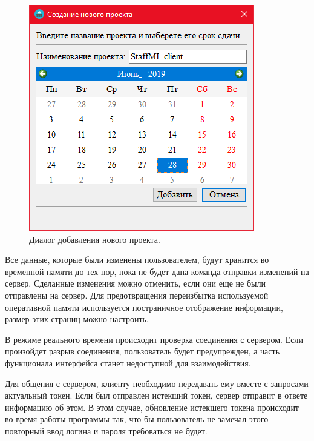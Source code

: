 \begin{figure}[h]
    \centering
    \includegraphics[width=0.5\linewidth]{img/add_project.png}
    \caption{Диалог добавления нового проекта.}
    \label{fig:add_project_window_win}
\end{figure}

Все данные, которые были изменены пользователем, будут хранится во временной памяти до тех пор, пока не будет дана команда отправки изменений на сервер.
Сделанные изменения можно отменить, если они еще не были отправлены на сервер.
Для предотвращения переизбытка используемой оперативной памяти используется постраничное отображение информации, размер этих страниц можно настроить.

В режиме реального времени происходит проверка соединения с сервером. Если произойдет разрыв соединения, пользователь будет предупрежден,
а часть функционала интерфейса станет недоступной для взаимодействия.

Для общения с сервером, клиенту необходимо передавать ему вместе с запросами актуальный токен.
Если был отправлен истекший токен, сервер отправит в ответе информацию об этом.
В этом случае, обновление истекшего токена происходит во время работы программы так,
что бы пользователь не замечал этого --- повторный ввод логина и пароля требоваться не будет.

